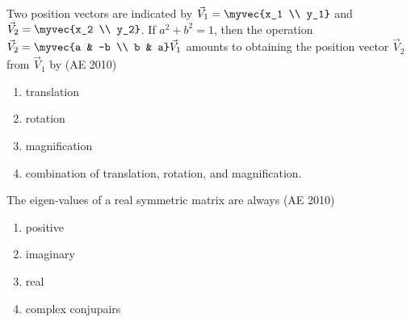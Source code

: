 \item Two position vectors are indicated by $ \vec{V}_1 = \myvec{x_1 \\ y_1} $ and $ \vec{V}_2 = \myvec{x_2 \\ y_2} $. If $ a^2 + b^2 = 1 $, then the operation $ \vec{V}_2 = \myvec{a & -b \\ b & a} \vec{V}_1 $ amounts to obtaining the position vector $ \vec{V}_2 $ from $ \vec{V}_1 $ by
\hfill (AE 2010)
\begin{enumerate}
\item translation
\item rotation
\item magnification
\item combination of translation, rotation, and magnification.
\end{enumerate}
\item The eigen-values of a real symmetric matrix are always
\hfill (AE 2010)
\begin{multicols}{2}
\begin{enumerate}
\item positive
\item imaginary
\item real
\item complex conjupairs
\end{enumerate}
\end{multicols}

